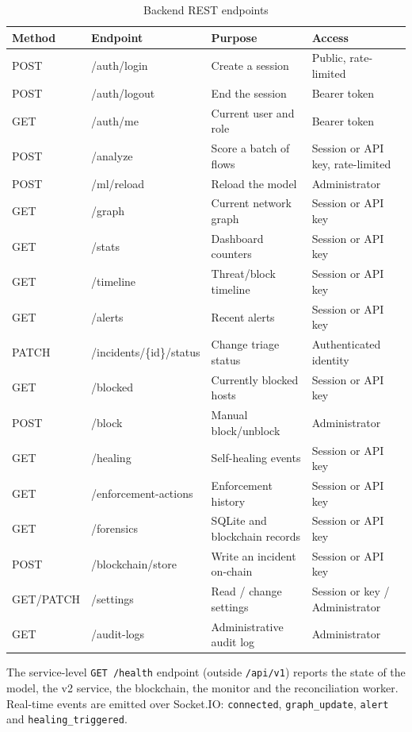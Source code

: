 \documentclass[12pt,a4paper]{report}
\begin{document}
\begin{table}[htbp]
\caption{Backend REST endpoints}
\label{tab:api}
\centering
\begin{tabularx}{\textwidth}{|l|l|X|X|}
\hline
\textbf{Method} & \textbf{Endpoint} & \textbf{Purpose} & \textbf{Access} \\
\hline
POST & /auth/login & Create a session & Public, rate-limited \\
POST & /auth/logout & End the session & Bearer token \\
GET & /auth/me & Current user and role & Bearer token \\
POST & /analyze & Score a batch of flows & Session or API key, rate-limited \\
POST & /ml/reload & Reload the model & Administrator \\
GET & /graph & Current network graph & Session or API key \\
GET & /stats & Dashboard counters & Session or API key \\
GET & /timeline & Threat/block timeline & Session or API key \\
GET & /alerts & Recent alerts & Session or API key \\
PATCH & /incidents/\{id\}/status & Change triage status & Authenticated identity \\
GET & /blocked & Currently blocked hosts & Session or API key \\
POST & /block & Manual block/unblock & Administrator \\
GET & /healing & Self-healing events & Session or API key \\
GET & /enforcement-actions & Enforcement history & Session or API key \\
GET & /forensics & SQLite and blockchain records & Session or API key \\
POST & /blockchain/store & Write an incident on-chain & Session or API key \\
GET/PATCH & /settings & Read / change settings & Session or key / Administrator \\
GET & /audit-logs & Administrative audit log & Administrator \\
\hline
\end{tabularx}
\end{table}

The service-level \texttt{GET /health} endpoint (outside \texttt{/api/v1}) reports the state of the model, the v2 service, the blockchain, the monitor and the reconciliation worker. Real-time events are emitted over Socket.IO: \texttt{connected}, \texttt{graph\_update}, \texttt{alert} and \texttt{healing\_triggered}.
\end{document}
